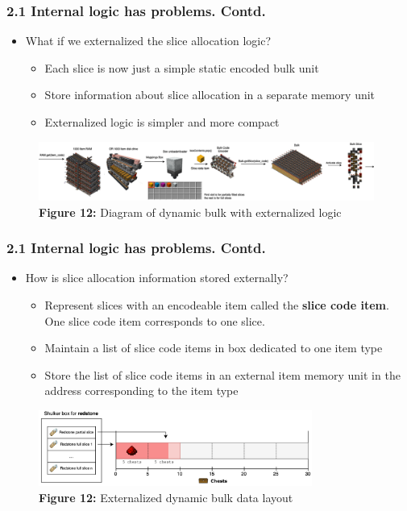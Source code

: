 \documentclass[aspectratio=169]{beamer}
\begin{document}
\begin{frame}
	\frametitle{2.1 Internal logic has problems. Contd.}

    \begin{itemize}
		\item What if we externalized the slice allocation logic?
        \begin{itemize}
        \item Each slice is now just a simple static encoded bulk unit
        \item Store information about slice allocation in a separate memory unit
        \item Externalized logic is simpler and more compact
        \end{itemize}
	\end{itemize}
    \begin{figure}
        \includegraphics[width=0.98\textwidth]{dynamicbulk2.png}
        \caption{\textbf{Figure 12:} Diagram of dynamic bulk with externalized logic}
	
    \end{figure}

\end{frame}


\begin{frame}
	\frametitle{2.1 Internal logic has problems. Contd.}

    \begin{itemize}
		\item How is slice allocation information stored externally?
        \begin{itemize}
        \item Represent slices with an encodeable item called the \textbf{slice code item}. One slice code item corresponds to one slice.
        \item Maintain a list of slice code items in box dedicated to one item type
        \item Store the list of slice code items in an external item memory unit in the address corresponding to the item type
        \end{itemize}
	\end{itemize}
    \begin{figure}
        \includegraphics[width=0.8\textwidth]{externallayout.png}
        \caption{\textbf{Figure 12:} Externalized dynamic bulk data layout}
	
    \end{figure}

\end{frame}
\end{document}
